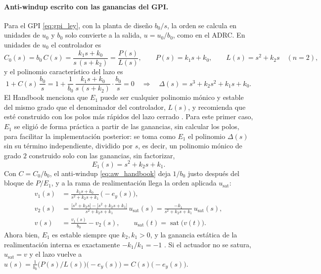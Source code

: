 \paragraph{Anti-windup escrito con las ganancias del GPI.} Para el GPI
\eqref{eq:gpi_ley}, con la planta de diseño $b_0/s$, la orden se calcula en
unidades de $u_0$ y $b_0$ solo convierte a la salida, $u = u_0/b_0$, como en el
ADRC. En unidades de $u_0$ el controlador es
\begin{equation}
C_0(s) = b_0\,C(s) = \frac{k_1 s + k_0}{s\,(s + k_2)} = \frac{P(s)}{L(s)},
\qquad
P(s) = k_1 s + k_0,
\qquad
L(s) = s^2 + k_2 s \quad (n = 2) ,
\end{equation}
y el polinomio característico del lazo es
\begin{equation}
1 + C(s)\,\frac{b_0}{s}
= 1 + \frac{1}{b_0}\,\frac{k_1 s + k_0}{s\,(s + k_2)}\cdot\frac{b_0}{s} = 0
\quad\Longrightarrow\quad
\Delta(s) = s^3 + k_2 s^2 + k_1 s + k_0 .
\end{equation}
El Handbook menciona que $E_1$ puede ser cualquier polinomio mónico y estable del mismo grado
que el denominador del controlador, $L(s)$, y recomienda que esté construido con los polos más
rápidos del lazo cerrado \cite[ec.~19.3]{levine2011handbook}. Para este primer caso, $E_1$ se eligió de forma práctica a partir de las
ganancias, sin calcular los polos, para facilitar la implementación posterior: se toma como $E_1$
el polinomio $\Delta(s)$ sin su término independiente, dividido por $s$, es decir, un polinomio
mónico de grado $2$ construido solo con las ganancias, sin factorizar,
\begin{equation}
E_1(s) = s^2 + k_2 s + k_1 .
\label{eq:aw_E1_ganancias}
\end{equation}
Con $C = C_0/b_0$, el anti-windup \eqref{eq:aw_handbook} deja $1/b_0$ justo
después del bloque de $P/E_1$, y a la rama de realimentación llega la orden
aplicada $u_{\mathrm{sat}}$:
\begin{align}
v_1(s) &= \frac{k_1 s + k_0}{s^2 + k_2 s + k_1}\,\bigl(-e_y(s)\bigr), \nonumber\\[4pt]
v_2(s) &= \frac{\bigl[s^2 + k_2 s\bigr] - \bigl[s^2 + k_2 s + k_1\bigr]}{s^2 + k_2 s + k_1}\,u_{\mathrm{sat}}(s)
= \frac{-k_1}{s^2 + k_2 s + k_1}\,u_{\mathrm{sat}}(s), \nonumber\\[4pt]
v(s) &= \frac{v_1(s)}{b_0} - v_2(s), \qquad u_{\mathrm{sat}}(t) = \operatorname{sat}\bigl(v(t)\bigr) .
\label{eq:aw_gpi}
\end{align}
Ahora bien, $E_1$ es estable siempre que $k_2, k_1 > 0$, y
la ganancia estática de la realimentación interna es exactamente $-k_1/k_1 = -1$
. Si el actuador no se satura, $u_{\mathrm{sat}} = v$ y el lazo vuelve a
$u(s) = \frac{1}{b_0}\bigl(P(s)/L(s)\bigr)\bigl(-e_y(s)\bigr) = C(s)\bigl(-e_y(s)\bigr)$.

